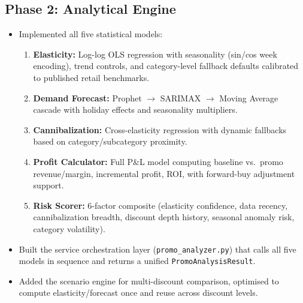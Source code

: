 \documentclass[11pt, a4paper]{article}
\begin{document}
\subsection{Phase 2: Analytical Engine}
\begin{itemize}[leftmargin=1.5em]
    \item Implemented all five statistical models:
    \begin{enumerate}
        \item \textbf{Elasticity:} Log-log OLS regression with seasonality (sin/cos week encoding), trend controls, and category-level fallback defaults calibrated to published retail benchmarks.
        \item \textbf{Demand Forecast:} Prophet $\rightarrow$ SARIMAX $\rightarrow$ Moving Average cascade with holiday effects and seasonality multipliers.
        \item \textbf{Cannibalization:} Cross-elasticity regression with dynamic fallbacks based on category/subcategory proximity.
        \item \textbf{Profit Calculator:} Full P\&L model computing baseline vs.~promo revenue/margin, incremental profit, ROI, with forward-buy adjustment support.
        \item \textbf{Risk Scorer:} 6-factor composite (elasticity confidence, data recency, cannibalization breadth, discount depth history, seasonal anomaly risk, category volatility).
    \end{enumerate}
    \item Built the service orchestration layer (\texttt{promo\_analyzer.py}) that calls all five models in sequence and returns a unified \texttt{PromoAnalysisResult}.
    \item Added the scenario engine for multi-discount comparison, optimised to compute elasticity/forecast once and reuse across discount levels.
\end{itemize}
\end{document}
